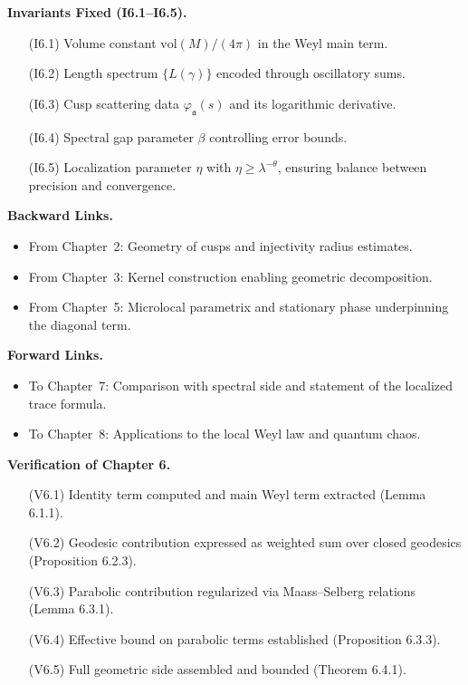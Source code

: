 \medskip

\noindent\textbf{Invariants Fixed (I6.1–I6.5).}
\begin{itemize}
  \item[(I6.1)] Volume constant $\mathrm{vol}(M)/(4\pi)$ in the Weyl main term.
  \item[(I6.2)] Length spectrum $\{L(\gamma)\}$ encoded through oscillatory sums.
  \item[(I6.3)] Cusp scattering data $\varphi_\mathfrak{a}(s)$ and its logarithmic derivative.
  \item[(I6.4)] Spectral gap parameter $\beta$ controlling error bounds.
  \item[(I6.5)] Localization parameter $\eta$ with $\eta \ge \lambda^{-\theta}$, ensuring balance between precision and convergence.
\end{itemize}

\medskip

\noindent\textbf{Backward Links.}
\begin{itemize}
  \item From Chapter~2: Geometry of cusps and injectivity radius estimates.
  \item From Chapter~3: Kernel construction enabling geometric decomposition.
  \item From Chapter~5: Microlocal parametrix and stationary phase underpinning the diagonal term.
\end{itemize}

\medskip

\noindent\textbf{Forward Links.}
\begin{itemize}
  \item To Chapter~7: Comparison with spectral side and statement of the localized trace formula.
  \item To Chapter~8: Applications to the local Weyl law and quantum chaos.
\end{itemize}

\medskip

\noindent\textbf{Verification of Chapter 6.}
\begin{itemize}
  \item[(V6.1)] Identity term computed and main Weyl term extracted (Lemma 6.1.1).
  \item[(V6.2)] Geodesic contribution expressed as weighted sum over closed geodesics (Proposition 6.2.3).
  \item[(V6.3)] Parabolic contribution regularized via Maass–Selberg relations (Lemma 6.3.1).
  \item[(V6.4)] Effective bound on parabolic terms established (Proposition 6.3.3).
  \item[(V6.5)] Full geometric side assembled and bounded (Theorem 6.4.1).
\end{itemize}

